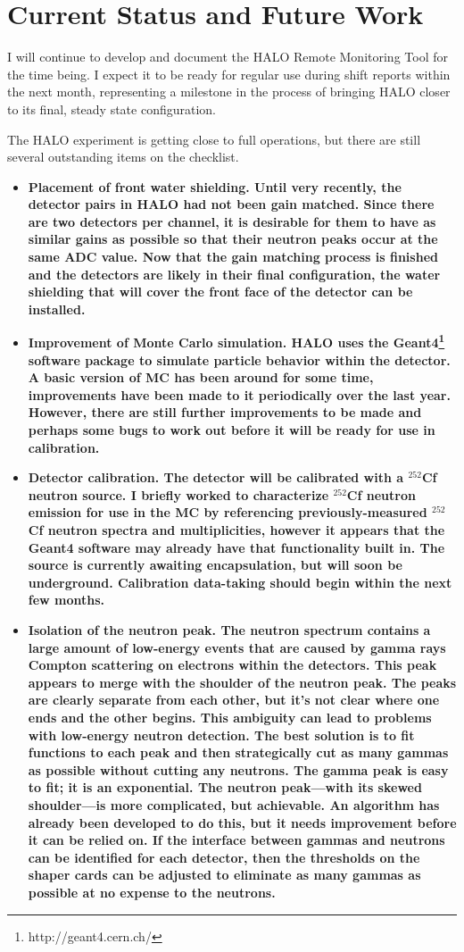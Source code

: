	\section{Current Status and Future Work}
		I will continue to develop and document the HALO Remote Monitoring Tool for the time being. I expect it to be ready for regular use during shift reports within the next month, representing a milestone in the process of bringing HALO closer to its final, steady state configuration. 

		The HALO experiment is getting close to full operations, but there are still several outstanding items on the checklist. 
		\begin{itemize}
			\item \bf Placement of front water shielding. \rm Until very recently, the \he detector pairs in HALO had not been gain matched. Since there are two detectors per channel, it is desirable for them to have as similar gains as possible so that their neutron peaks occur at the same ADC value. Now that the gain matching process is finished and the \he detectors are likely in their final configuration, the water shielding that will cover the front face of the detector can be installed. 
			\item \bf Improvement of Monte Carlo simulation. \rm HALO uses the Geant4\footnote{http://geant4.cern.ch/} software package to simulate particle behavior within the detector. A basic version of MC has been around for some time, improvements have been made to it periodically over the last year. However, there are still further improvements to be made and perhaps some bugs to work out before it will be ready for use in calibration.
			\item \bf Detector calibration. \rm The detector will be calibrated with a $^{252}$Cf neutron source. I briefly worked to characterize $^{252}$Cf neutron emission for use in the MC by referencing previously-measured $^{252}$Cf neutron spectra and multiplicities, however it appears that the Geant4 software may already have that functionality built in. The source is currently awaiting encapsulation, but will soon be underground. Calibration data-taking should begin within the next few months.
			\item \bf Isolation of the neutron peak. \rm The neutron spectrum contains a large amount of low-energy events that are caused by gamma rays Compton scattering on electrons within the detectors. This peak appears to merge with the shoulder of the neutron peak. The peaks are clearly separate from each other, but it's not clear where one ends and the other begins. This ambiguity can lead to problems with low-energy neutron detection. The best solution is to fit functions to each peak and then strategically cut as many gammas as possible without cutting any neutrons. The gamma peak is easy to fit; it is an exponential. The neutron peak---with its skewed shoulder---is more complicated, but achievable. An algorithm has already been developed to do this, but it needs improvement before it can be relied on. If the interface between gammas and neutrons can be identified for each \he detector, then the thresholds on the shaper cards can be adjusted to eliminate as many gammas as possible at no expense to the neutrons.

\end{itemize}
